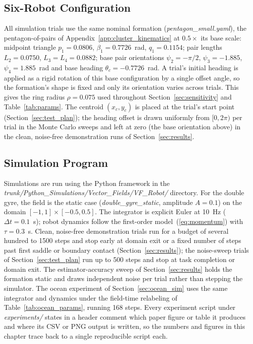 \documentclass[12pt, letterpaper, oneside]{report}
\begin{document}
\subsection{Six-Robot Configuration}

All simulation trials use the same nominal formation
(\textit{pentagon\_small.yaml}), the pentagon-of-pairs of
Appendix~\ref{app:cluster_kinematics} at $0.5\times$ its base scale: midpoint
triangle $p_1 = 0.0806$, $\beta_1 = 0.7726$~rad, $q_1 = 0.1154$; pair
lengths $L_2 = 0.0750$, $L_3 = L_4 = 0.0882$; base pair orientations
$\psi_2 = -\pi/2$, $\psi_3 = -1.885$, $\psi_4 = 1.885$~rad and base
heading $\theta_c = -0.7726$~rad. A trial's initial heading is applied
as a rigid rotation of this base configuration by a single offset
angle, so the formation's shape is fixed and only its orientation
varies across trials. This gives the ring radius $\rho = 0.075$ used
throughout Section~\ref{sec:sensitivity} and Table~\ref{tab:params}.
The centroid $(x_c, y_c)$ is placed at the trial's start point
(Section~\ref{sec:test_plan}); the heading offset is drawn uniformly
from $[0, 2\pi)$ per trial in the Monte Carlo sweeps and left at zero
(the base orientation above) in the clean, noise-free demonstration
runs of Section~\ref{sec:results}.

\subsection{Simulation Program}

Simulations are run using the Python framework in the
\textit{trunk/Python\_Simulations/Vector\_Fields/VF\_Robot/} directory.
For the double gyre, the field is the static case
(\textit{double\_gyre\_static}, amplitude $A = 0.1$) on the domain
$[-1, 1] \times [-0.5, 0.5]$. The integrator is explicit Euler at
10~Hz ($\Delta t = 0.1$~s); robot dynamics follow the first-order
model~(\ref{eq:momentum}) with $\tau = 0.3$~s. Clean, noise-free
demonstration trials run for a budget of several hundred to 1500 steps
and stop early at domain exit or a fixed number of steps past first
saddle or boundary contact (Section~\ref{sec:results}); the noise-sweep trials of
Section~\ref{sec:test_plan} run up to 500 steps and stop at task
completion or domain exit. The estimator-accuracy sweep of
Section~\ref{sec:results} holds the formation static and draws
independent noise per trial rather than stepping the simulator. The
ocean experiment of Section~\ref{sec:ocean_sim} uses the same
integrator and dynamics under the field-time relabeling of
Table~\ref{tab:ocean_params}, running 168 steps. Every experiment
script under \textit{experiments/} states in a header comment which
paper figure or table it produces and where its CSV or PNG output is
written, so the numbers and figures in this chapter trace back to a
single reproducible script each.
\end{document}
